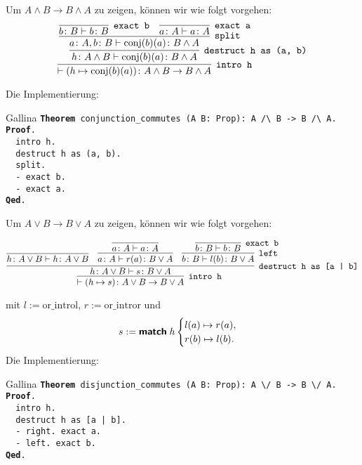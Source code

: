 \documentclass[8pt]{beamer}
\newcommand{\strong}[1]{\textsf{\textbf{#1}}}
\newcommand{\cond}{\rightarrow}
\newcommand{\kw}[1]{\textbf{#1}}
\begin{document}
\begin{frame}
Um $A\land B\cond B\land A$ zu zeigen, können wir wie folgt vorgehen:
\[\infer[\texttt{intro h}]{\vdash (h\mapsto \mathrm{conj}(b)(a))\colon A\land B\to B\land A}{
  \infer[\texttt{destruct h as (a, b)}]{h\colon A\land B\vdash\mathrm{conj}(b)(a)\colon B\land A}{
    \infer[\texttt{split}]{a\colon A, b\colon B\vdash\mathrm{conj}(b)(a)\colon B\land A}{
      \infer[\texttt{exact b}]{b\colon B\vdash b\colon B}{}
    & \infer[\texttt{exact a}]{a\colon A\vdash a\colon A}{}
    }
  }
}\]\pause

Die Implementierung:
\begin{block}{Gallina}
\texttt{\kw{Theorem} conjunction\_commutes (A B: Prop): A /{\textbackslash} B -> B /{\textbackslash} A.\\
\kw{Proof}.\\
\ \ intro h.\\
\ \ destruct h as (a, b).\\
\ \ split.\\
\ \ - exact b.\\
\ \ - exact a.\\
\kw{Qed}.}
\end{block}
\end{frame}

\begin{frame}
Um $A\lor B\cond B\lor A$ zu zeigen, können wir wie folgt vorgehen:
\begin{small}
\[
\infer[\texttt{intro h}]{\vdash (h\mapsto s)\colon A\lor B\to B\lor A}{
  \infer[\texttt{destruct h as [a | b]}]{h\colon A\lor B\vdash s\colon B\lor A}{
    \infer{h\colon A\lor B\vdash h\colon A\lor B}{}
  & \infer{a\colon A\vdash r(a)\colon B\lor A}{
      \infer{a\colon A\vdash a\colon A}{}}
  & \infer[\texttt{left}]{b\colon B\vdash l(b)\colon B\lor A}{
      \infer[\texttt{exact b}]{b\colon B\vdash b\colon B}{}}}}
\]
\end{small}
mit $l := \mathrm{or\_introl}$, $r := \mathrm{or\_intror}$ und
\[s := \strong{match}\;h\begin{cases}
l(a)\mapsto r(a),\\
r(b)\mapsto l(b).
\end{cases}
\]\pause
Die Implementierung:
\begin{block}{Gallina}
\texttt{\kw{Theorem} disjunction\_commutes (A B: Prop): A {\textbackslash}/ B -> B {\textbackslash}/ A.\\
\kw{Proof}.\\
\ \ intro h.\\
\ \ destruct h as [a | b].\\
\ \ - right. exact a.\\
\ \ - left.  exact b.\\
\kw{Qed}.}
\end{block}
\end{frame}
\end{document}
